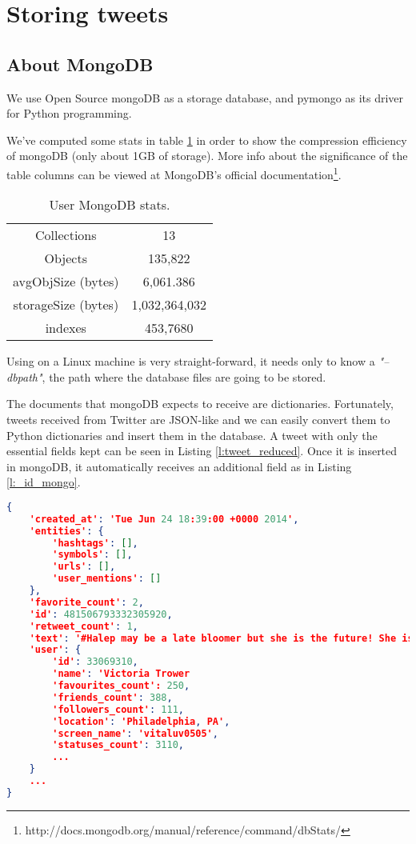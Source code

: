 \section{Storing tweets}
\label{sec:store-tweets}

\subsection{About MongoDB}

We use Open Source mongoDB as a storage database, and pymongo as its driver for Python programming.

We've computed some stats in table \ref{table:mongo-stats} in order to show the compression efficiency of mongoDB (only about 1GB of storage). More info about the significance of the table columns can be viewed at MongoDB's official documentation\footnote{\label{mongo-stats-explained}http://docs.mongodb.org/manual/reference/command/dbStats/}.

\begin{table}[!h]
\centering
\setlength{\tabcolsep}{12pt}
\begin{tabular}{ c | c }
Collections & 13 \\
Objects & 135,822 \\
avgObjSize (bytes) & 6,061.386 \\
storageSize (bytes) & 1,032,364,032 \\
indexes & 453,7680 \\
\end{tabular}
\caption{User MongoDB stats.}
\label{table:mongo-stats}
\end{table}

Using on a Linux machine is very straight-forward, it needs only to know a \textit{"--dbpath"}, the path where the database files are going to be stored.

The documents that mongoDB expects to receive are dictionaries. Fortunately, tweets received from Twitter are JSON-like and we can easily convert them to Python dictionaries and insert them in the database. A tweet with only the essential fields kept can be seen in Listing \ref{l:tweet_reduced}.
Once it is inserted in mongoDB, it automatically receives an additional field as in Listing \ref{l:_id_mongo}.


\begin{lstlisting}[caption=Tweet Reduced, label=l:tweet_reduced, language=json,firstnumber=1]
{
	'created_at': 'Tue Jun 24 18:39:00 +0000 2014',
	'entities': {
		'hashtags': [],
		'symbols': [],
		'urls': [],
		'user_mentions': []
	},
	'favorite_count': 2,
	'id': 481506793332305920,
	'retweet_count': 1,
	'text': '#Halep may be a late bloomer but she is the future! She is one of my new favorites. Beautiful playing. #Wimbledon14 #thehill',
 	'user': {
		'id': 33069310,
		'name': 'Victoria Trower
		'favourites_count': 250,
		'friends_count': 388,
		'followers_count': 111,
		'location': 'Philadelphia, PA',
		'screen_name': 'vitaluv0505',
		'statuses_count': 3110,
		...
	}
	...
}
\end{lstlisting}


